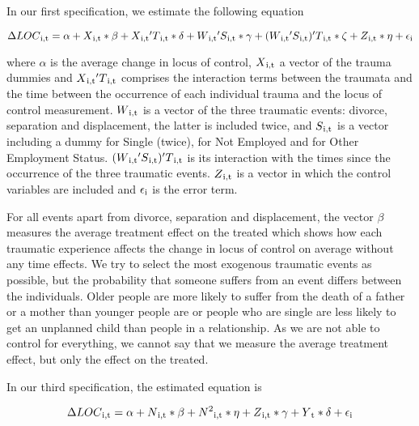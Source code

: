 \documentclass[12pt, a4paper, fleqn, parskip]{scrartcl}
\begin{document}
In our first specification, we estimate the following equation

\begin{center}
	$ \Delta LOC \textsubscript{i,t}= \alpha + X \textsubscript{i,t} * \beta  + X \textsubscript{i,t} ' T \textsubscript{i,t} * \delta + W \textsubscript{i,t} ' S \textsubscript{i,t} * \gamma + (W \textsubscript{i,t} ' S \textsubscript{i,t}) ' T \textsubscript{i,t} * \zeta + Z \textsubscript{i,t} * \eta + \epsilon\textsubscript{i}  $
\end{center}

where $\alpha$ is the average change in locus of control, $
X\textsubscript{i,t}$ a vector of the trauma dummies and $ X
\textsubscript{i,t} ' T \textsubscript{i,t}$ comprises the interaction terms
between the traumata and the time between the occurrence of each individual
trauma and the locus of control measurement. $ W \textsubscript{i,t}$ is a
vector of the three traumatic events: divorce, separation and displacement, the
latter is included twice, and $ S \textsubscript{i,t} $ is a vector including a
dummy for Single (twice), for Not Employed and for Other Employment Status. $(W
\textsubscript{i,t} ' S \textsubscript{i,t}) ' T \textsubscript{i,t} $ is its
interaction with the times since the occurrence of the three traumatic events.
$ Z \textsubscript{i,t}$ is a vector in which the control variables are
included and $\epsilon\textsubscript{i}$ is the error term.

For all events apart from divorce, separation and displacement, the vector $\beta$ 
measures the average treatment effect on the treated which
shows how each traumatic experience affects the change in locus of control on average without
any time effects. 
We try to select the most exogenous traumatic events as possible, but the probability that someone suffers 
from an event differs between the individuals. Older people are more likely to suffer from the death of a father or a mother than younger people are or people who are single are less likely to get an unplanned child than people in a relationship. As we are not able to control for everything, we cannot say that we
measure the average treatment effect, but only the effect on the treated.


In our third specification, the estimated equation is

\begin{align}
	\Delta LOC \textsubscript{i,t}= \alpha + N \textsubscript{i,t} * \beta + N
	\textsuperscript{2}\textsubscript{i,t} * \eta + Z \textsubscript{i,t} *
	\gamma + Y\textsubscript{t} * \delta + \epsilon\textsubscript{i}
\end{align}
\end{document}
